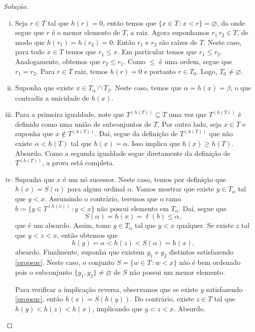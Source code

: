 \documentclass[a4paper]{article}
\begin{document}
\begin{proof}[Solução]\hfill
  \begin{enumerate}[(i)]

  \item Seja \(r\in T\) tal que \(h(r)=0\), então temos que \(\{x\in T\,\colon
    x<r\}=\varnothing\), da onde segue que \(r\) é o menor elemento de \(T\), a raiz.
    Agora suponhamos \(r_1\, r_2\in T\), de modo que \(h(r_1)=h(r_2)=0\). Então \(r_1\) e
    \(r_2\) são raízes de \(T\). Neste caso,  para todo \(x\in T\) temos que
    \(r_1\leq x\). Em particular temos que \(r_1\leq r_2\).
    Analogamente, obtemos que \(r_2\leq r_1\). Como \(\leq\) é
    uma ordem, segue que \(r_1=r_2\). Para \(r\in T\) raiz, temos \(h(r)=0\) e portanto
    \(r\in T_0\). Logo, \(T_0\not=\varnothing\).
    
  \item Suponha que existe \(x\in T_\alpha\cap T_\beta\). Neste caso, temos que
    \(\alpha=h(x)=\beta\), o que contradiz a unicidade de \(h(x)\).

  \item Para a primeira igualdade, note que \(T^{(h(T))}\subseteq T\) uma vez
    que \(T^{(h(T))}\) é definido como uma união de subconjuntos de \(T\). Por
    outro lado, seja \(x\in T\) e suponha que \(x\not\in T^{(h(T))}\). Daí,
    segue da definição de \(T^{(h(T))}\) que não existe \(\alpha < h(T)\) tal
    que \(h(x)=\alpha\). Isso implica
    que \(h(x)\geq h(T)\). Absurdo. Como a segunda igualdade segue diretamente da
    definição de \(T^{(h(T))}\), a prova está completa. 

  \item Suponha que \(x\) é um nó sucessor. Neste caso, temos por definição
    que \(h(x)=S(\alpha)\) para algum ordinal \(\alpha\). Vamos mostrar que
    existe \(y\in T_\alpha\) tal que \(y < x\). Assumindo o contrário, teremos
    que o ramo \(b\coloneqq\{y\in T^{(h(x))}\,\colon y<x\}\) não possui elemento em
    \(T_\alpha\). Daí, segue que \[S(\alpha)=h(x)=\ell(b)\leq\alpha,\] que é um absurdo. 
    Assim, tome \(y\in T_\alpha\) tal que \(y<x\) qualquer. Se
    existe \(z\) tal que \(y<z<x\), então obtemos
    que \[h(y)=\alpha<h(z)<S(\alpha)=h(x),\] 
    absurdo. Finalmente, suponha que existem \(y_1\) e \(y_2\) distintos satisfazendo
    \eqref{propsuc}. Neste caso, o conjunto \(S=\{w\in
    T\,\colon w <x\}\) não é bem ordenado pois o subconjunto
    \(\{y_1,y_2\}\not = \varnothing\) de \(S\) não possui um menor elemento.

    Para verificar a implicação reversa, observamos que se existe \(y\) satisfazendo
    \eqref{propsuc}, então \(h(x)=S(h(y))\). Do contrário, existe \(z\in T\) tal
    que \(h(y)<h(z)<h(x)\), implicando que \(y<z<x\). Absurdo.


\end{enumerate}
\end{proof}
\end{document}
